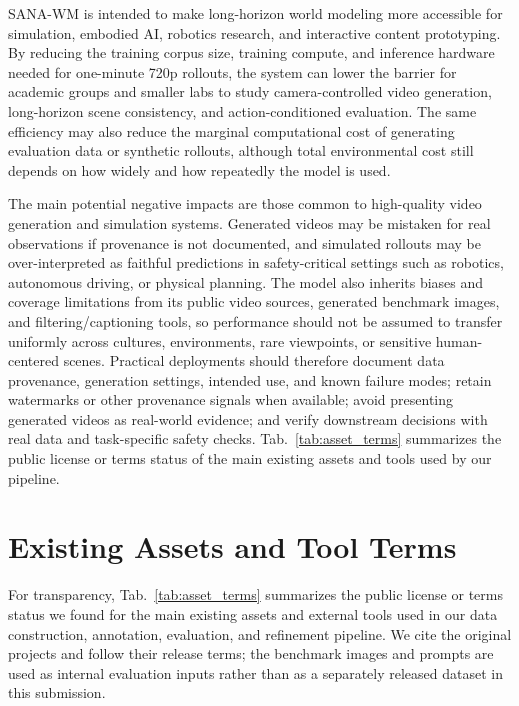 \documentclass{llmxive}
\providecommand{\modelname}{SANA-WM\xspace}
\begin{document}
\modelname is intended to make long-horizon world modeling more accessible for simulation, embodied AI, robotics research, and interactive content prototyping.
By reducing the training corpus size, training compute, and inference hardware needed for one-minute 720p rollouts, the system can lower the barrier for academic groups and smaller labs to study camera-controlled video generation, long-horizon scene consistency, and action-conditioned evaluation.
The same efficiency may also reduce the marginal computational cost of generating evaluation data or synthetic rollouts, although total environmental cost still depends on how widely and how repeatedly the model is used.

\noindent The main potential negative impacts are those common to high-quality video generation and simulation systems.
Generated videos may be mistaken for real observations if provenance is not documented, and simulated rollouts may be over-interpreted as faithful predictions in safety-critical settings such as robotics, autonomous driving, or physical planning.
The model also inherits biases and coverage limitations from its public video sources, generated benchmark images, and filtering/captioning tools, so performance should not be assumed to transfer uniformly across cultures, environments, rare viewpoints, or sensitive human-centered scenes.
Practical deployments should therefore document data provenance, generation settings, intended use, and known failure modes; retain watermarks or other provenance signals when available; avoid presenting generated videos as real-world evidence; and verify downstream decisions with real data and task-specific safety checks.
Tab.~\ref{tab:asset_terms} summarizes the public license or terms status of the main existing assets and tools used by our pipeline.

\section{Existing Assets and Tool Terms}
\label{sec:appendix_asset_terms}

For transparency, Tab.~\ref{tab:asset_terms} summarizes the public license or terms status we found for the main existing assets and external tools used in our data construction, annotation, evaluation, and refinement pipeline.
We cite the original projects and follow their release terms; the benchmark images and prompts are used as internal evaluation inputs rather than as a separately released dataset in this submission.
\end{document}

